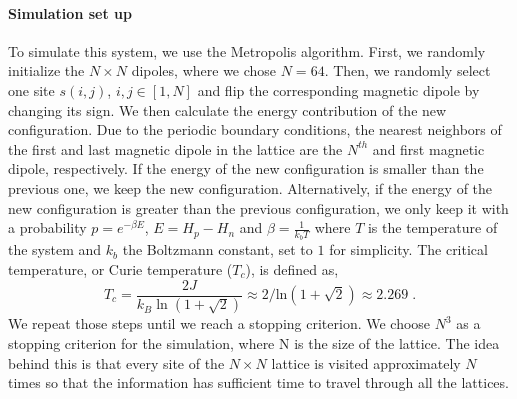 \documentclass[11pt, authoryear]{elsarticle}
\begin{document}
\begin{appendix}
		\paragraph{Simulation set up}
		To simulate this system, we use the Metropolis algorithm. First, we randomly initialize the $N \times N$ dipoles, where we chose $N=64$. Then, we randomly select one site $s(i,j)$, $i,j\in [1,N]$ and flip the corresponding magnetic dipole by changing its sign. We then calculate the energy contribution of the new configuration. Due to the periodic boundary conditions,  the nearest neighbors of the first and last magnetic dipole in the lattice are the $N^{th}$ and first magnetic dipole, respectively.
		If the energy of the new configuration is smaller than the previous one, we keep the new configuration. Alternatively, if the energy of the new configuration is greater than the previous configuration, we only keep it with a probability $p=e^{-\beta E}$, $E=H_p-H_n$ and $\beta = \frac{1}{k_b T}$ where $T$ is the temperature of the system and $k_b$ the Boltzmann constant, set to $1$ for simplicity. 
		The critical temperature, or Curie temperature ($T_c$), is defined as,
		\begin{equation}
			\label{eq:Tc}
			T_c = \frac{2J}{k_B \ln(1+\sqrt{2} )} \approx 2/\mathrm{ln}(1+\sqrt{2}) \approx 2.269\;.
		\end{equation}
		We repeat those steps until we reach a stopping criterion.
		We choose $N^{3}$ as a stopping criterion for the simulation, where N is the size of the lattice. The idea behind this is that every site of the $N \times N$ lattice is visited approximately $N$ times so that the information has sufficient time to travel through all the lattices. 
		
		

\end{appendix}
\end{document}

